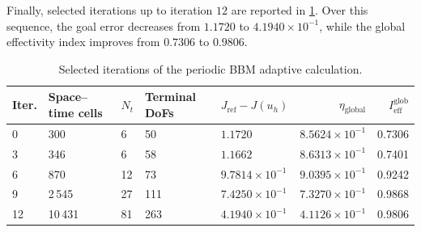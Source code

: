 Finally, selected iterations up to iteration \(12\) are reported in \cref{tab:bbm-results}. Over this sequence, the goal error decreases from \(1.1720\) to \(4.1940\times10^{-1}\), while the global effectivity index improves from \(0.7306\) to \(0.9806\). 
\begin{table}[!htbp]
\centering
\small
\setlength{\tabcolsep}{4pt}
\begin{tabular}{lllllrr}
\toprule
Iter. & Space--time cells &
$N_t$ & Terminal DoFs & $ J_{\mathrm{ref}}-J(u_h)$ & $\eta_{\mathrm{global}}$ & $I_{\mathrm{eff}}^{\mathrm{glob}}$ \\
\midrule
 0 &     300 &     6 &    50 & $1.1720$                   & $8.5624\times10^{-1}$ & 0.7306 \\
 3 & 346 & 6 & 58 & $1.1662$ & $8.6313\times10^{-1}$ & 0.7401 \\
 6 &     870 &    12 &    73 & $9.7814\times10^{-1}$     & $9.0395\times10^{-1}$ & 0.9242 \\
 9 &   2\,545 &    27 &   111 & $7.4250\times10^{-1}$     & $7.3270\times10^{-1}$ & 0.9868 \\
12 &  10\,431 &    81 &   263 & $4.1940\times10^{-1}$     & $4.1126\times10^{-1}$ & 0.9806 \\
\bottomrule
\end{tabular}
\caption{Selected iterations of the periodic BBM adaptive calculation.}
\label{tab:bbm-results}
\end{table}

